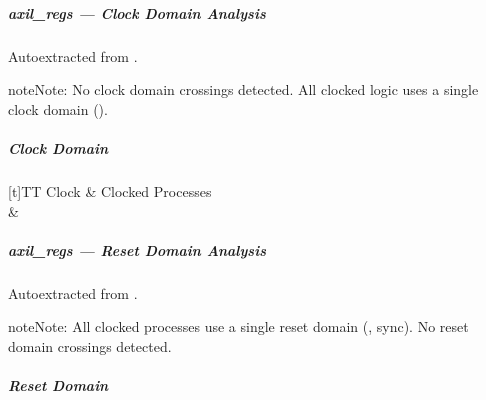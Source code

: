 \documentclass[letterpaper,10pt,english]{sphinxmanual}
\begin{document}
\sphinxstepscope


\subparagraph{axil\_regs — Clock Domain Analysis}
\label{\detokenize{modules/axil_regs/cdc:axil-regs-clock-domain-analysis}}\label{\detokenize{modules/axil_regs/cdc::doc}}
\sphinxAtStartPar
Auto\sphinxhyphen{}extracted from .

\begin{sphinxadmonition}{note}{Note:}
\sphinxAtStartPar
No clock domain crossings detected. All clocked logic uses a single clock domain ().
\end{sphinxadmonition}


\subparagraph{Clock Domain}
\label{\detokenize{modules/axil_regs/cdc:clock-domain}}

\begin{savenotes}\sphinxattablestart
\sphinxthistablewithglobalstyle
\centering
\begin{tabulary}{\linewidth}[t]{TT}
\sphinxtoprule
\sphinxstyletheadfamily 
\sphinxAtStartPar
Clock
&\sphinxstyletheadfamily 
\sphinxAtStartPar
Clocked Processes
\\
\sphinxmidrule
\sphinxtableatstartofbodyhook
\sphinxAtStartPar
{}
&
\sphinxAtStartPar
{}
\\
\sphinxbottomrule
\end{tabulary}
\sphinxtableafterendhook\par
\sphinxattableend\end{savenotes}

\sphinxstepscope


\subparagraph{axil\_regs — Reset Domain Analysis}
\label{\detokenize{modules/axil_regs/reset:axil-regs-reset-domain-analysis}}\label{\detokenize{modules/axil_regs/reset::doc}}
\sphinxAtStartPar
Auto\sphinxhyphen{}extracted from .

\begin{sphinxadmonition}{note}{Note:}
\sphinxAtStartPar
All clocked processes use a single reset domain (, sync). No reset domain crossings detected.
\end{sphinxadmonition}


\subparagraph{Reset Domain}
\label{\detokenize{modules/axil_regs/reset:reset-domain}}
\end{document}
